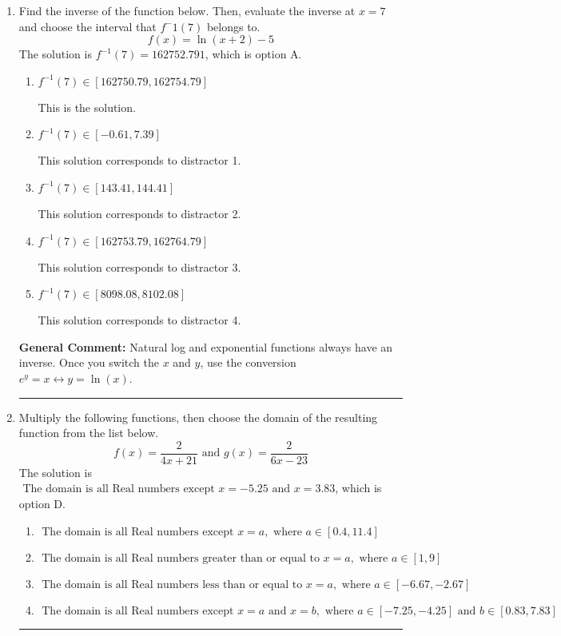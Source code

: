 \documentclass{extbook}[14pt]
\newcommand{\litem}[1]{\item #1

\rule{\textwidth}{0.4pt}}
\begin{document}
\begin{enumerate}\litem{
Find the inverse of the function below. Then, evaluate the inverse at $x = 7$ and choose the interval that $f^-1(7)$ belongs to.
\[ f(x) = \ln{(x+2)}-5 \]The solution is \( f^{-1}(7) = 162752.791 \), which is option A.\begin{enumerate}[label=\Alph*.]
\item \( f^{-1}(7) \in [162750.79, 162754.79] \)

 This is the solution.
\item \( f^{-1}(7) \in [-0.61, 7.39] \)

 This solution corresponds to distractor 1.
\item \( f^{-1}(7) \in [143.41, 144.41] \)

 This solution corresponds to distractor 2.
\item \( f^{-1}(7) \in [162753.79, 162764.79] \)

 This solution corresponds to distractor 3.
\item \( f^{-1}(7) \in [8098.08, 8102.08] \)

 This solution corresponds to distractor 4.
\end{enumerate}

\textbf{General Comment:} Natural log and exponential functions always have an inverse. Once you switch the $x$ and $y$, use the conversion $ e^y = x \leftrightarrow y=\ln(x)$.
}
\litem{
Multiply the following functions, then choose the domain of the resulting function from the list below.
\[ f(x) = \frac{2}{4x+21} \text{ and } g(x) = \frac{2}{6x-23} \]The solution is \( \text{ The domain is all Real numbers except } x = -5.25 \text{ and } x = 3.83 \), which is option D.\begin{enumerate}[label=\Alph*.]
\item \( \text{ The domain is all Real numbers except } x = a, \text{ where } a \in [0.4, 11.4] \)


\item \( \text{ The domain is all Real numbers greater than or equal to } x = a, \text{ where } a \in [1, 9] \)


\item \( \text{ The domain is all Real numbers less than or equal to } x = a, \text{ where } a \in [-6.67, -2.67] \)


\item \( \text{ The domain is all Real numbers except } x = a \text{ and } x = b, \text{ where } a \in [-7.25, -4.25] \text{ and } b \in [0.83, 7.83] \)



\end{enumerate}}
\end{enumerate}
\end{document}
